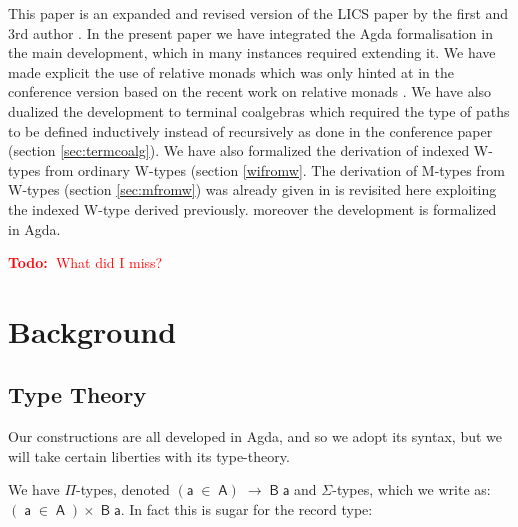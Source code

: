 \documentclass[a4paper]{article}
\makeatletter
\newcommand{\todo}[1]{\textcolor{red}{\textbf{Todo:~}#1}}
\newcommand{\Conid}[1]{\mathit{#1}}
\newcommand{\Varid}[1]{\mathit{#1}}
\newcommand{\anonymous}{\kern0.06em \vbox{\hrule\@width.5em}}
\def\resethooks{%
  \global\let\SaveRestoreHook\empty
  \global\let\ColumnHook\empty}
\newcommand{\hsindent}[1]{\quad}%
\let\hspre\empty
\let\hspost\empty
\renewcommand\Varid[1]{\mathord{\textsf{#1}}}
\let\Conid\Varid
\newcommand\Keyword[1]{\textsf{\textbf{#1}}}
\makeatother
\begin{document}
This paper is an expanded and revised version of the LICS paper by the
first and 3rd author \cite{lics}. In the present paper we have
integrated the Agda formalisation in the main development, which in
many instances required extending it. We have made explicit the use of
relative monads which was only hinted at in the conference version
based on the recent work on relative monads \cite{relmon}. We have
also dualized the development to terminal coalgebras which required
the type of paths to be defined inductively instead of recursively as
done in the conference paper (section \ref{sec:termcoalg}).  We
have also formalized the derivation of indexed W-types from ordinary
W-types (section \ref{wifromw}. The derivation of M-types from W-types
(section \ref{sec:mfromw})
was already given in \cite{C-CSPTs} is revisited here exploiting the
indexed W-type derived previously. moreover the development is formalized in
Agda. 

\todo{What did I miss?}


\section{Background}
\label{sec:background}

 

\subsection{Type Theory}

\newcommand{\prodd}{\ensuremath{\mathaccent\cdot{\prod}}}





Our constructions are all developed in Agda, and so we adopt its syntax, but we will take certain liberties with its type-theory. 

We have $\Pi$-types, denoted \ensuremath{(\Varid{a}\;\in\;\Conid{A})\;\rightarrow\;\Conid{B}\;\Varid{a}} and $\Sigma$-types, which we write as: \ensuremath{(\!\;\Varid{a}\;\in\;\Conid{A}\;\!)\times\;\Conid{B}\;\Varid{a}}. In fact this is sugar for the record type:

\resethooks
\end{document}
